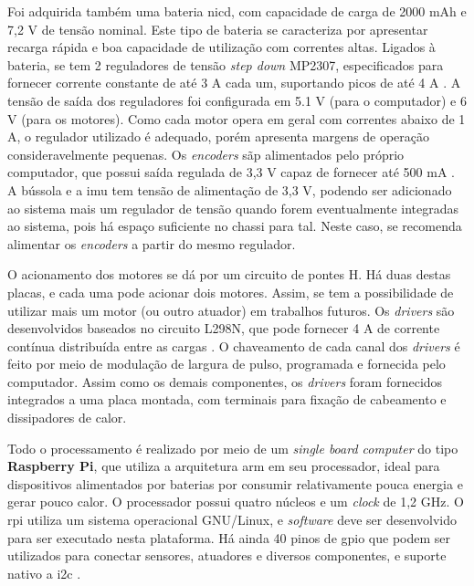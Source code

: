 Foi adquirida também uma bateria \acrshort{nicd}, com capacidade de carga de 2000 mAh e 7,2 V de tensão nominal. Este tipo de bateria se caracteriza por apresentar recarga rá\acrshort{pid}a e boa capacidade de utilização com correntes altas. Ligados à bateria, se tem 2 reguladores de tensão \textit{step down} MP2307, especificados para fornecer corrente constante de até 3 A cada um, suportando picos de até 4 A \citep{MP2307}. A tensão de saída dos reguladores foi configurada em 5.1 V (para o computador) e 6 V (para os motores). Como cada motor opera em geral com correntes abaixo de 1 A, o regulador utilizado é adequado, porém apresenta margens de operação consideravelmente pequenas. Os \textit{encoders} sãp alimentados pelo próprio computador, que possui saída regulada de 3,3 V capaz de fornecer até 500 mA \citep{upton2014raspberry}. A bússola e a \acrshort{imu} tem tensão de alimentação de 3,3 V, podendo ser adicionado ao sistema mais um regulador de tensão quando forem eventualmente integradas ao sistema, pois há espaço suficiente no chassi para tal. Neste caso, se recomenda alimentar os \textit{encoders} a partir do mesmo regulador.

O acionamento dos motores se dá por um circuito de pontes H. Há duas destas placas, e cada uma pode acionar dois motores. Assim, se tem a possibilidade de utilizar mais um motor (ou outro atuador) em trabalhos futuros. Os \textit{drivers} são desenvolvidos baseados no circuito L298N, que pode fornecer 4 A de corrente contínua distribuída entre as cargas \citep{L298N}. O chaveamento de cada canal dos \textit{drivers} é feito por meio de modulação de largura de pulso, programada e fornecida pelo computador. Assim como os demais componentes, os \textit{drivers} foram fornecidos integrados a uma placa montada, com terminais para fixação de cabeamento e dissipadores de calor.

Todo o processamento é realizado por meio de um \emph{single board computer} do tipo \textbf{Raspberry Pi}, que utiliza a arquitetura \acrshort{arm} em seu processador, ideal para dispositivos alimentados por baterias por consumir relativamente pouca energia e gerar pouco calor. O processador possui quatro núcleos e um \emph{clock} de 1,2 GHz. O \acrshort{rpi} utiliza um sistema operacional GNU/Linux, e \emph{software} deve ser desenvolvido para ser executado nesta plataforma. Há ainda 40 pinos de \acrlong{gpio} que podem ser utilizados para conectar sensores, atuadores e diversos componentes, e suporte nativo a \acrshort{i2c} \citep{upton2014raspberry}.

